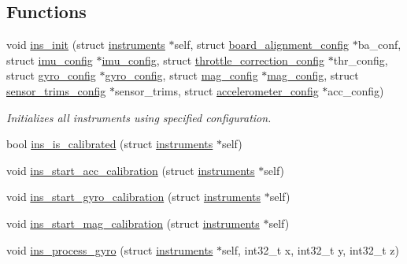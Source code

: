 \subsection*{Functions}
\begin{DoxyCompactItemize}
\item 
void \hyperlink{group__Instrument_ga61b7fb031aa4467016f278499ab3ce6c}{ins\+\_\+init} (struct \hyperlink{structinstruments}{instruments} $\ast$self, struct \hyperlink{structboard__alignment__config}{board\+\_\+alignment\+\_\+config} $\ast$ba\+\_\+conf, struct \hyperlink{structimu__config}{imu\+\_\+config} $\ast$\hyperlink{structimu__config}{imu\+\_\+config}, struct \hyperlink{structthrottle__correction__config}{throttle\+\_\+correction\+\_\+config} $\ast$thr\+\_\+config, struct \hyperlink{structgyro__config}{gyro\+\_\+config} $\ast$\hyperlink{structgyro__config}{gyro\+\_\+config}, struct \hyperlink{structmag__config}{mag\+\_\+config} $\ast$\hyperlink{structmag__config}{mag\+\_\+config}, struct \hyperlink{structsensor__trims__config}{sensor\+\_\+trims\+\_\+config} $\ast$sensor\+\_\+trims, struct \hyperlink{structaccelerometer__config}{accelerometer\+\_\+config} $\ast$acc\+\_\+config)
\begin{DoxyCompactList}\small\item\em Initializes all instruments using specified configuration. \end{DoxyCompactList}\item 
bool \hyperlink{group__Instrument_gad94176bbfa1cc3c1548ee241787eb98a}{ins\+\_\+is\+\_\+calibrated} (struct \hyperlink{structinstruments}{instruments} $\ast$self)
\item 
void \hyperlink{group__Instrument_ga20231fe90708aed1062e8ee4b5c9c695}{ins\+\_\+start\+\_\+acc\+\_\+calibration} (struct \hyperlink{structinstruments}{instruments} $\ast$self)
\item 
void \hyperlink{group__Instrument_ga177072b7ee3259c7c95181002ff587b6}{ins\+\_\+start\+\_\+gyro\+\_\+calibration} (struct \hyperlink{structinstruments}{instruments} $\ast$self)
\item 
void \hyperlink{group__Instrument_ga3377f93808683a90ec4de025409e5cbf}{ins\+\_\+start\+\_\+mag\+\_\+calibration} (struct \hyperlink{structinstruments}{instruments} $\ast$self)
\item 
void \hyperlink{group__Instrument_ga87572d36a8af9fcad5d632a721ed671d}{ins\+\_\+process\+\_\+gyro} (struct \hyperlink{structinstruments}{instruments} $\ast$self, int32\+\_\+t x, int32\+\_\+t y, int32\+\_\+t z)
\item 

\end{DoxyCompactItemize}
